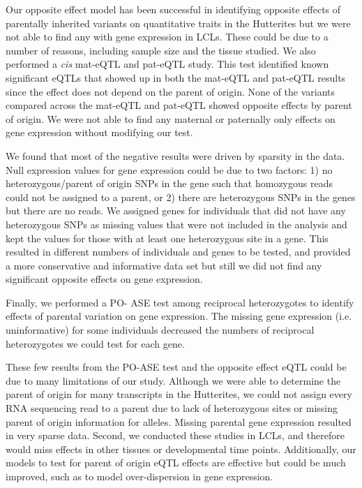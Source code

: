 Our opposite effect model has been successful in identifying opposite effects of parentally inherited variants on quantitative traits in the Hutterites but we were not able to find any with gene expression in LCLs. These could be due to a number of reasons, including sample size and the tissue studied. We also performed a \emph{cis} mat-eQTL and pat-eQTL study. This test identified known significant eQTLs that showed up in both the mat-eQTL and pat-eQTL results since the effect does not depend on the parent of origin. None of the variants compared across the mat-eQTL and pat-eQTL showed opposite effects by parent of origin. We were not able to find any maternal or paternally only effects on gene expression without modifying our test.

We found that most of the negative results were driven by sparsity in the data. Null expression values for gene expression could be due to two factors: 1) no heterozygous/parent of origin SNPs in the gene such that homozygous reads could not be assigned to a parent, or 2) there are heterozygous SNPs in the genes but there are no reads. We assigned genes for individuals that did not have any heterozygous SNPs as missing values that were not included in the analysis and kept the values for those with at least one heterozygous site in a gene. This resulted in different numbers of individuals and genes to be tested, and provided a more conservative and informative data set but still we did not find any significant opposite effects on gene expression.

Finally, we performed a PO- ASE test among reciprocal heterozygotes to identify effects of parental variation on gene expression. The missing gene expression (i.e. uninformative) for some individuals decreased the numbers of reciprocal heterozygotes we could test for each gene.

These few results from the PO-ASE test and the opposite effect eQTL could be due to many limitations of our study. Although we were able to determine the parent of origin for many transcripts in the Hutterites, we could not assign every RNA sequencing read to a parent due to lack of heterozygous sites or missing parent of origin information for alleles. Missing parental gene expression resulted in very sparse data. Second, we conducted these studies in LCLs, and therefore would miss effects in other tissues or developmental time points. Additionally, our models to test for parent of origin eQTL effects are effective but could be much improved, such as to model over-dispersion in gene expression.

